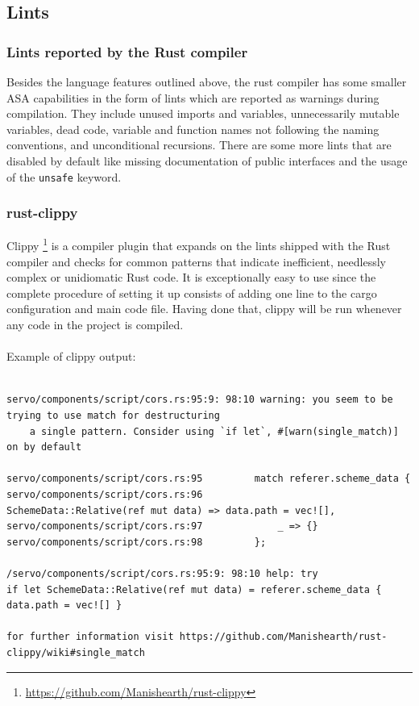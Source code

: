 \documentclass{scrartcl}
\begin{document}
\subsection{Lints}

\subsubsection{Lints reported by the Rust compiler}

Besides the language features outlined above, the rust compiler has some smaller ASA capabilities in the form of lints which are reported as warnings during compilation. They include unused imports and variables, unnecessarily mutable variables, dead code, variable and function names not following the naming conventions, and unconditional recursions. There are some more lints that are disabled by default like missing documentation of public interfaces and the usage of the \texttt{unsafe} keyword.

\subsubsection{rust-clippy} \label{clippy}

Clippy \footnote{\url{https://github.com/Manishearth/rust-clippy}} is a compiler plugin that expands on the lints shipped with the Rust compiler and checks for common patterns that indicate inefficient, needlessly complex or unidiomatic Rust code. It is exceptionally easy to use since the complete procedure of setting it up consists of adding one line to the cargo configuration and main code file. Having done that, clippy will be run whenever any code in the project is compiled.\\
\\

Example of clippy output:
{
\scriptsize
\begin{verbatim}

servo/components/script/cors.rs:95:9: 98:10 warning: you seem to be trying to use match for destructuring
    a single pattern. Consider using `if let`, #[warn(single_match)] on by default
    
servo/components/script/cors.rs:95         match referer.scheme_data {
servo/components/script/cors.rs:96             SchemeData::Relative(ref mut data) => data.path = vec![],
servo/components/script/cors.rs:97             _ => {}
servo/components/script/cors.rs:98         };

/servo/components/script/cors.rs:95:9: 98:10 help: try
if let SchemeData::Relative(ref mut data) = referer.scheme_data { data.path = vec![] }

for further information visit https://github.com/Manishearth/rust-clippy/wiki#single_match

\end{verbatim}
}
\end{document}
